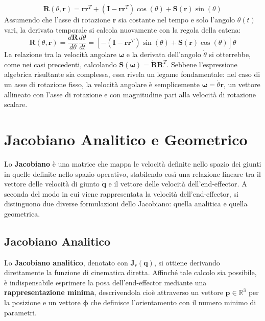\documentclass[11pt, a4paper]{report}
\begin{document}
\[
    \bm{R}(\theta, \bm{r}) = \bm{r}\bm{r}^T + (\bm{I} - \bm{r}\bm{r}^T)\cos(\theta) + \bm{S}(\bm{r})\sin(\theta)
\]
Assumendo che l'asse di rotazione \(\bm{r}\) sia costante nel tempo e solo l'angolo \(\theta(t)\) vari, la derivata temporale si calcola nuovamente con la regola della catena:
\[
    \dot{\bm{R}}(\theta, \bm{r}) = \frac{d\bm{R}}{d\theta}\frac{d\theta}{dt} = \left[ -(\bm{I} - \bm{r}\bm{r}^T)\sin(\theta) + \bm{S}(\bm{r})\cos(\theta) \right] \dot{\theta}
\]
La relazione tra la velocità angolare \(\bm{\omega}\) e la derivata dell'angolo \(\dot{\theta}\) si otterrebbe, come nei casi precedenti, calcolando \(\bm{S}(\bm{\omega}) = \dot{\bm{R}}\bm{R}^T\). Sebbene l'espressione algebrica risultante sia complessa, essa rivela un legame fondamentale: nel caso di un asse di rotazione fisso, la velocità angolare è semplicemente \(\bm{\omega} = \dot{\theta}\bm{r}\), un vettore allineato con l'asse di rotazione e con magnitudine pari alla velocità di rotazione scalare.
\newpage
\section{Jacobiano Analitico e Geometrico}
Lo \textbf{Jacobiano} è una matrice che mappa le velocità definite nello spazio dei giunti in quelle definite nello spazio operativo, stabilendo così una relazione lineare tra il vettore delle velocità di giunto \(\dot{\bm{q}}\) e il vettore delle velocità dell'end-effector. A seconda del modo in cui viene rappresentata la velocità dell'end-effector, si distinguono due diverse formulazioni dello Jacobiano: quella analitica e quella geometrica.

\subsection{Jacobiano Analitico}
Lo \textbf{Jacobiano analitico}, denotato con \(\bm{J}_r(\bm{q})\), si ottiene derivando direttamente la funzione di cinematica diretta. Affinché tale calcolo sia possibile, è indispensabile esprimere la posa dell'end-effector mediante una \textbf{rappresentazione minima}, descrivendola cioè attraverso un vettore \(\bm{p} \in \mathbb{R}^3\) per la posizione e un vettore \(\bm{\phi}\) che definisce l'orientamento con il numero minimo di parametri.
\end{document}
